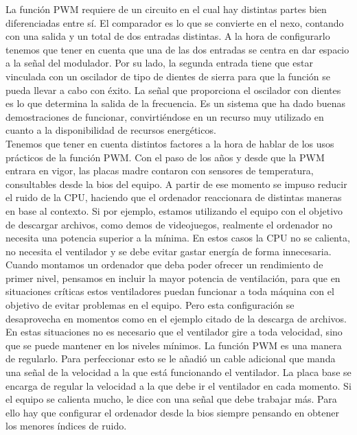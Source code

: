 \documentclass[10pt,a4paper]{article}
\begin{document}
La función PWM requiere de un circuito en el cual hay distintas partes bien diferenciadas entre sí. El comparador es lo que se convierte en el nexo, contando con una salida y un total de dos entradas distintas. A la hora de configurarlo tenemos que tener en cuenta que una de las dos entradas se centra en dar espacio a la señal del modulador. Por su lado, la segunda entrada tiene que estar vinculada con un oscilador de tipo de dientes de sierra para que la función se pueda llevar a cabo con éxito. La señal que proporciona el oscilador con dientes es lo que determina la salida de la frecuencia. Es un sistema que ha dado buenas demostraciones de funcionar, convirtiéndose en un recurso muy utilizado en cuanto a la disponibilidad de recursos energéticos.\\

Tenemos que tener en cuenta distintos factores a la hora de hablar de los usos prácticos de la función PWM. Con el paso de los años y desde que la PWM entrara en vigor, las placas madre contaron con sensores de temperatura, consultables desde la bios del equipo. A partir de ese momento se impuso reducir el ruido de la CPU, haciendo que el ordenador reaccionara de distintas maneras en base al contexto. Si por ejemplo, estamos utilizando el equipo con el objetivo de descargar archivos, como demos de videojuegos, realmente el ordenador no necesita una potencia superior a la mínima. En estos casos la CPU no se calienta, no necesita el ventilador y se debe evitar gastar energía de forma innecesaria.\\

Cuando montamos un ordenador que deba poder ofrecer un rendimiento de primer nivel, pensamos en incluir la mayor potencia de ventilación, para que en situaciones críticas estos ventiladores puedan funcionar a toda máquina con el objetivo de evitar problemas en el equipo. Pero esta configuración se desaprovecha en momentos como en el ejemplo citado de la descarga de archivos. En estas situaciones no es necesario que el ventilador gire a toda velocidad, sino que se puede mantener en los niveles mínimos. La función PWM es una manera de regularlo. Para perfeccionar esto se le añadió un cable adicional que manda una señal de la velocidad a la que está funcionando el ventilador. La placa base se encarga de regular la velocidad a la que debe ir el ventilador en cada momento. Si el equipo se calienta mucho, le dice con una señal que debe trabajar más. Para ello hay que configurar el ordenador desde la bios siempre pensando en obtener los menores índices de ruido.\\ 
\end{document}
